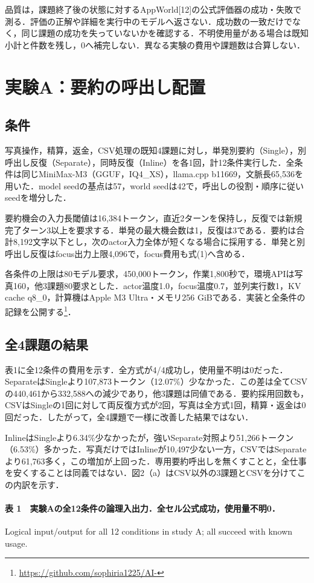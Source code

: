 \documentclass{article}
\begin{document}
品質は，課題終了後の状態に対するAppWorld[12]の公式評価器の成功・失敗で測る．評価の正解や詳細を実行中のモデルへ返さない．成功数の一致だけでなく，同じ課題の成功を失っていないかを確認する．不明使用量がある場合は既知小計と件数を残し，0へ補完しない．異なる実験の費用や課題数は合算しない．

\section{実験A：要約の呼出し配置}
\subsection{条件}
写真操作，精算，返金，CSV処理の既知4課題に対し，単発別要約（Single），別呼出し反復（Separate），同時反復（Inline）を各1回，計12条件実行した．全条件は同じMiniMax-M3（GGUF，IQ4\_XS），llama.cpp b11669，文脈長65,536を用いた．model seedの基点は57，world seedは42で，呼出しの役割・順序に従いseedを増分した．

要約機会の入力長閾値は16,384トークン，直近2ターンを保持し，反復では新規完了ターン3以上を要求する．単発の最大機会数は1，反復は3である．要約は合計8,192文字以下とし，次のactor入力全体が短くなる場合に採用する．単発と別呼出し反復はfocus出力上限4,096で，focus費用も式(1)へ含める．

各条件の上限は80モデル要求，450,000トークン，作業1,800秒で，環境APIは写真160，他3課題80要求とした．actor温度1.0，focus温度0.7，並列実行数1，KV cache q8\_0，計算機はApple M3 Ultra・メモリ256 GiBである．実装と全条件の記録を公開する\footnote{\url{https://github.com/sophiria1225/AI-}}．

\subsection{全4課題の結果}
表1に全12条件の費用を示す．全方式が4/4成功し，使用量不明は0だった．SeparateはSingleより107,873トークン（12.07\%）少なかった．この差は全てCSVの440,461から332,588への減少であり，他3課題は同値である．要約採用回数も，CSVはSingleの1回に対して両反復方式が2回，写真は全方式1回，精算・返金は0回だった．したがって，全4課題で一様に改善した結果ではない．

InlineはSingleより6.34\%少なかったが，強いSeparate対照より51,266トークン（6.53\%）多かった．写真だけではInlineが10,497少ない一方，CSVではSeparateより61,763多く，この増加が上回った．専用要約呼出しを無くすことと，全仕事を安くすることは同義ではない．図2（a）はCSV以外の3課題とCSVを分けてこの内訳を示す．

\paragraph*{表 1　実験Aの全12条件の論理入出力．全セル公式成功，使用量不明0．}
\noindent Logical input/output for all 12 conditions in study A; all succeed with known usage.
\end{document}
